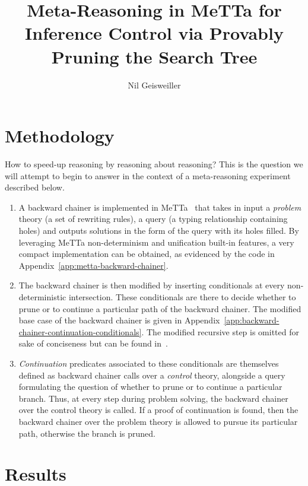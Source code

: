 \documentclass{easychair}
\title{Meta-Reasoning in MeTTa for Inference Control via Provably
  Pruning the Search Tree}
\author{Nil Geisweiller}
\institute{
  SingularityNET Foundation,\\
  Zug, Switzerland\\
  \email{nil@singularitynet.io}
}
\begin{document}
\maketitle

\section{Methodology}
\label{sect:introduction}

How to speed-up reasoning by reasoning about reasoning?  This is the
question we will attempt to begin to answer in the context of a
meta-reasoning experiment described below.
\begin{enumerate}
\item A backward chainer is implemented in MeTTa~\cite{TODO} that
  takes in input a \emph{problem} theory (a set of rewriting rules), a
  query (a typing relationship containing holes) and outputs solutions
  in the form of the query with its holes filled.  By leveraging MeTTa
  non-determinism and unification built-in features, a very compact
  implementation can be obtained, as evidenced by the code in
  Appendix~\ref{app:metta-backward-chainer}.
\item The backward chainer is then modified by inserting conditionals
  at every non-deterministic intersection.  These conditionals are
  there to decide whether to prune or to continue a particular path of
  the backward chainer.  The modified base case of the backward
  chainer is given in
  Appendix~\ref{app:backward-chainer-continuation-conditionals}.  The
  modified recursive step is omitted for sake of conciseness but can
  be found in~\cite{TODO}.
\item \emph{Continuation} predicates associated to these conditionals
  are themselves defined as backward chainer calls over a
  \emph{control} theory, alongside a query formulating the question of
  whether to prune or to continue a particular branch.  Thus, at every
  step during problem solving, the backward chainer over the control
  theory is called.  If a proof of continuation is found, then the
  backward chainer over the problem theory is allowed to pursue its
  particular path, otherwise the branch is pruned.
\end{enumerate}

\section{Results}
\end{document}
